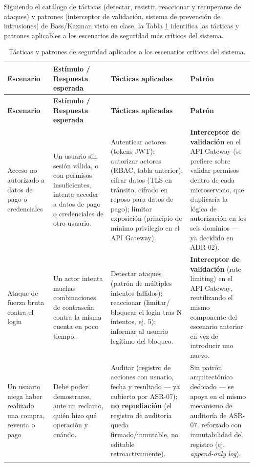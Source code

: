 \documentclass[12pt,a4paper]{article}
\begin{document}
Siguiendo el catálogo de tácticas (detectar, resistir, reaccionar y recuperarse de ataques) y
patrones (interceptor de validación, sistema de prevención de intrusiones) de Bass/Kazman visto en
clase, la Tabla \ref{tab:tacticas-seguridad} identifica las tácticas y patrones aplicables a los
escenarios de seguridad más críticos del sistema.

\begin{center}
\begin{longtable}{p{2.6cm}p{4.7cm}p{3.6cm}p{2.9cm}}
\toprule
\textbf{Escenario} & \textbf{Estímulo / Respuesta esperada} & \textbf{Tácticas aplicadas} & \textbf{Patrón}\\
\midrule
\endfirsthead
\toprule
\textbf{Escenario} & \textbf{Estímulo / Respuesta esperada} & \textbf{Tácticas aplicadas} & \textbf{Patrón}\\
\midrule
\endhead
Acceso no autorizado a datos de pago o credenciales &
Un usuario sin sesión válida, o con permisos insuficientes, intenta acceder a datos de pago o
credenciales de otro usuario. &
Autenticar actores (tokens JWT); autorizar actores (RBAC, tabla anterior); cifrar datos (TLS en
tránsito, cifrado en reposo para datos de pago); limitar exposición (principio de mínimo
privilegio en el API Gateway). &
\textbf{Interceptor de validación} en el API Gateway (se prefiere sobre validar permisos dentro
de cada microservicio, que duplicaría la lógica de autorización en los seis dominios — ya
decidido en ADR-02).\\[0.5em]

Ataque de fuerza bruta contra el login &
Un actor intenta muchas combinaciones de contraseña contra la misma cuenta en poco tiempo. &
Detectar ataques (patrón de múltiples intentos fallidos); reaccionar (limitar/ bloquear el login
tras N intentos, ej. 5); informar al usuario legítimo del bloqueo. &
\textbf{Interceptor de validación} (rate limiting) en el API Gateway, reutilizando el mismo
componente del escenario anterior en vez de introducir uno nuevo.\\[0.5em]

Un usuario niega haber realizado una compra, reventa o pago &
Debe poder demostrarse, ante un reclamo, quién hizo qué operación y cuándo. &
Auditar (registro de acciones con usuario, fecha y resultado — ya cubierto por ASR-07);
\textbf{no repudiación} (el registro de auditoría queda firmado/inmutable, no editable
retroactivamente). &
Sin patrón arquitectónico dedicado — se apoya en el mismo mecanismo de auditoría de ASR-07,
reforzado con inmutabilidad del registro (ej. \textit{append-only log}).\\
\bottomrule
\caption{Tácticas y patrones de seguridad aplicados a los escenarios críticos del sistema.}
\label{tab:tacticas-seguridad}
\end{longtable}
\end{center}
\end{document}
